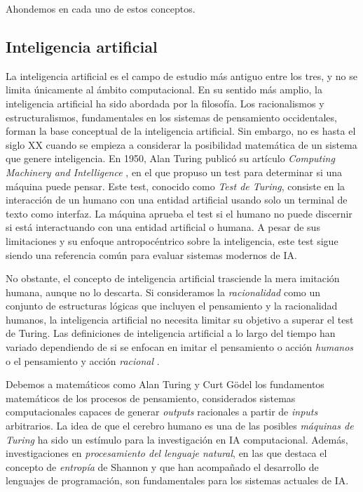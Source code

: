 Ahondemos en cada uno de estos conceptos.

\subsection{Inteligencia artificial}

La inteligencia artificial es el campo de estudio más antiguo entre los tres, y no se limita únicamente al ámbito computacional. En su sentido más amplio, la inteligencia artificial ha sido abordada por la filosofía. Los racionalismos y estructuralismos, fundamentales en los sistemas de pensamiento occidentales, forman la base conceptual de la inteligencia artificial. Sin embargo, no es hasta el siglo XX cuando se empieza a considerar la posibilidad matemática de un sistema que genere inteligencia. En 1950, Alan Turing publicó su artículo \textit{Computing Machinery and Intelligence} \citep{alan1950a}, en el que propuso un test para determinar si una máquina puede pensar. Este test, conocido como \textit{Test de Turing}, consiste en la interacción de un humano con una entidad artificial usando solo un terminal de texto como interfaz. La máquina aprueba el test si el humano no puede discernir si está interactuando con una entidad artificial o humana. A pesar de sus limitaciones y su enfoque antropocéntrico sobre la inteligencia, este test sigue siendo una referencia común para evaluar sistemas modernos de IA.

No obstante, el concepto de inteligencia artificial trasciende la mera imitación humana, aunque no lo descarta. Si consideramos la \textit{racionalidad} como un conjunto de estructuras lógicas que incluyen el pensamiento y la racionalidad humanos, la inteligencia artificial no necesita limitar su objetivo a superar el test de Turing. Las definiciones de inteligencia artificial a lo largo del tiempo han variado dependiendo de si se enfocan en imitar el pensamiento o acción \textit{humanos} o el pensamiento y acción \textit{racional} \citep{RussellStuartJ2021AI:A}.

Debemos a matemáticos como Alan Turing y Curt Gödel los fundamentos matemáticos de los procesos de pensamiento, considerados sistemas computacionales capaces de generar \textit{outputs} racionales a partir de \textit{inputs} arbitrarios. La idea de que el cerebro humano es una de las posibles \textit{máquinas de Turing} \citep{penroseNuevaMenteEmperador2015} ha sido un estímulo para la investigación en IA computacional. Además, investigaciones en \textit{procesamiento del lenguaje natural}, en las que destaca el concepto de \textit{entropía} de Shannon \citep{shannon1951prediction} y que han acompañado el desarrollo de lenguajes de programación, son fundamentales para los sistemas actuales de IA.


